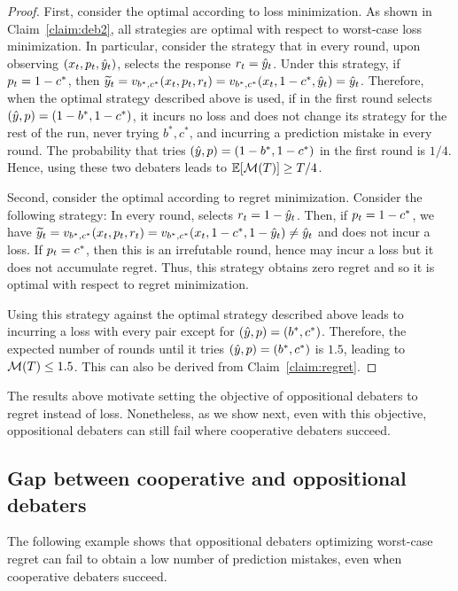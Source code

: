 \documentclass[anon]{alt2027} %
\begin{document}
\begin{proof}
First, consider the optimal \df according to loss minimization. As shown in Claim~\ref{claim:deb2}, all \df strategies are optimal with respect to worst-case loss minimization. In particular, consider the strategy that in every round, upon observing $(x_t, {p}_t, {\hat{y}}_t)$, selects the response ${r}_t = {\hat{y}}_t$. Under this strategy, if ${p}_t = 1-c^*$, then ${\widetilde{y}}_t = v_{b^*,c^*}(x_t,{p}_t,{r}_t) = v_{b^*,c^*}(x_t,1-c^*,{\hat{y}}_t) = {\hat{y}}_t$. Therefore, when the optimal \dt strategy described above is used, if in the first round \dt selects $({\hat{y}},{p}) = (1-b^*,1-c^*)$, it incurs no loss and does not change its strategy for the rest of the run, never trying $b^*, c^*$, and incurring a prediction mistake in every round. The probability that \dt tries $({\hat{y}},{p}) = (1-b^*,1-c^*)$ in the first round is $1/4$. Hence, using these two debaters leads to $\mathbb{E}[{\mathcal M}(T)] \geq T/4$.

Second, consider the optimal \df according to regret minimization. Consider the following strategy: In every round, \df selects ${r}_t = 1-{\hat{y}}_t$. Then, if ${p}_t = 1-c^*$, we have ${\widetilde{y}}_t = v_{b^*,c^*}(x_t,{p}_t,{r}_t) = v_{b^*,c^*}(x_t,1-c^*,1-{\hat{y}}_t) \neq {\hat{y}}_t$ and \df does not incur a loss. If  ${p}_t = c^*$, then this is an irrefutable round, hence \df may incur a loss but it does not accumulate regret. Thus, this strategy obtains zero regret and so it is optimal with respect to regret minimization. 

Using this strategy against the optimal \dt strategy described above leads to \dt incurring a loss with every pair except for $({\hat{y}},{p}) = (b^*,c^*)$. Therefore, the expected number of rounds until it tries $({\hat{y}},{p}) = (b^*,c^*)$ is $1.5$, leading to ${\mathcal M}(T) \leq 1.5$. This can also be derived from Claim~\ref{claim:regret}.
\end{proof}

 The results above motivate setting the objective of oppositional debaters to regret instead of loss. Nonetheless, as we show next, even with this objective, oppositional debaters can still fail where cooperative debaters succeed.



\subsection{Gap between cooperative and oppositional debaters}

The following example shows that oppositional debaters optimizing worst-case regret can fail to obtain a low number of prediction mistakes, even when cooperative debaters succeed. 
\end{document}
